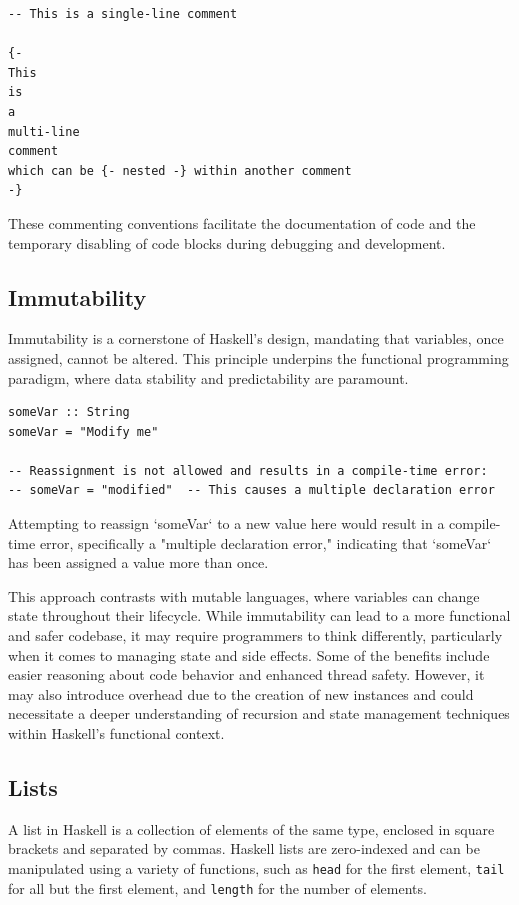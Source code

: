 \documentclass[a4paper, 10pt]{article}
\begin{document}
            \lstset{language=Haskell}
            \begin{lstlisting}
-- This is a single-line comment

{-
This
is
a
multi-line
comment
which can be {- nested -} within another comment
-}
            \end{lstlisting}

            These commenting conventions facilitate the documentation of code and the temporary disabling of code blocks during debugging and development.

        \newpage
        \subsection{Immutability}

            Immutability is a cornerstone of Haskell's design, mandating that variables, once assigned, cannot be altered. This principle underpins the functional programming paradigm, where data stability and predictability are paramount.

            \lstset{language=Haskell}
            \begin{lstlisting}
someVar :: String
someVar = "Modify me"

-- Reassignment is not allowed and results in a compile-time error:
-- someVar = "modified"  -- This causes a multiple declaration error
            \end{lstlisting}

            \noindent Attempting to reassign `someVar` to a new value here would result in a compile-time error, specifically a "multiple declaration error," indicating that `someVar` has been assigned a value more than once.
            
            \vspace{5mm}
            \noindent This approach contrasts with mutable languages, where variables can change state throughout their lifecycle. While immutability can lead to a more functional and safer codebase, it may require programmers to think differently, particularly when it comes to managing state and side effects. Some of the benefits include easier reasoning about code behavior and enhanced thread safety. However, it may also introduce overhead due to the creation of new instances and could necessitate a deeper understanding of recursion and state management techniques within Haskell's functional context.


    \subsection{Lists}
        A list in Haskell is a collection of elements of the same type, enclosed in square brackets and separated by commas. Haskell lists are zero-indexed and can be manipulated using a variety of functions, such as \texttt{head} for the first element, \texttt{tail} for all but the first element, and \texttt{length} for the number of elements.
\end{document}
